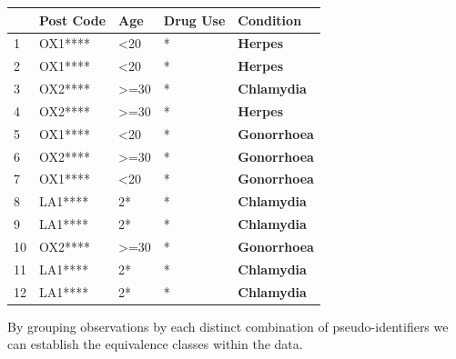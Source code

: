 \documentclass[
  12pt,
]{book}
\begin{document}
\begin{longtable}[]{@{}lllll@{}}
\toprule()
& Post Code & Age & Drug Use & \textbf{Condition} \\
\midrule()
\endhead
1 & OX1**** & \textless20 & * & \textbf{Herpes} \\
2 & OX1**** & \textless20 & * & \textbf{Herpes} \\
3 & OX2**** & \textgreater=30 & * & \textbf{Chlamydia} \\
4 & OX2**** & \textgreater=30 & * & \textbf{Herpes} \\
5 & OX1**** & \textless20 & * & \textbf{Gonorrhoea} \\
6 & OX2**** & \textgreater=30 & * & \textbf{Gonorrhoea} \\
7 & OX1**** & \textless20 & * & \textbf{Gonorrhoea} \\
8 & LA1**** & 2* & * & \textbf{Chlamydia} \\
9 & LA1**** & 2* & * & \textbf{Chlamydia} \\
10 & OX2**** & \textgreater=30 & * & \textbf{Gonorrhoea} \\
11 & LA1**** & 2* & * & \textbf{Chlamydia} \\
12 & LA1**** & 2* & * & \textbf{Chlamydia} \\
\bottomrule()
\end{longtable}

By grouping observations by each distinct combination of pseudo-identifiers we can establish the equivalence classes within the data.
\end{document}
